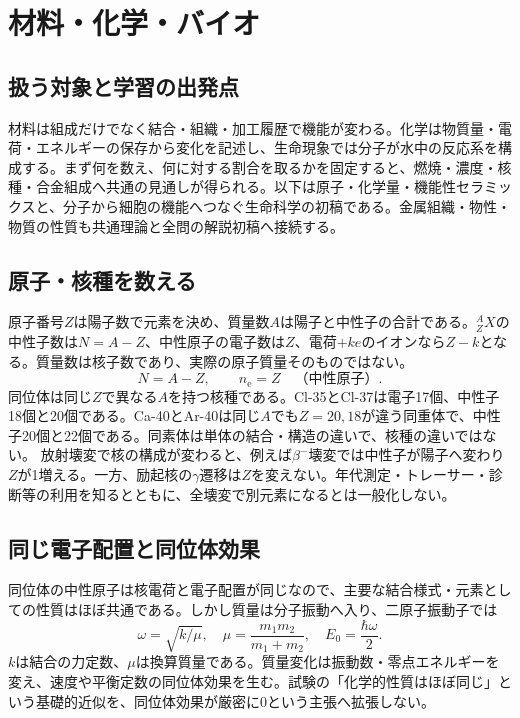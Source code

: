 \chapter{材料・化学・バイオ}
\section{扱う対象と学習の出発点}
材料は組成だけでなく結合・組織・加工履歴で機能が変わる。化学は物質量・電荷・エネルギーの保存から変化を記述し、生命現象では分子が水中の反応系を構成する。まず何を数え、何に対する割合を取るかを固定すると、燃焼・濃度・核種・合金組成へ共通の見通しが得られる。以下は原子・化学量・機能性セラミックスと、分子から細胞の機能へつなぐ生命科学の初稿である。金属組織・物性・物質の性質も共通理論と全問の解説初稿へ接続する。

\section{原子・核種を数える}
\label{theory:basicchem:isotope}
原子番号\(Z\)は陽子数で元素を決め、質量数\(A\)は陽子と中性子の合計である。\({}^{A}_{Z}X\)の中性子数は\(N=A-Z\)、中性原子の電子数は\(Z\)、電荷\(+ke\)のイオンなら\(Z-k\)となる。質量数は核子数であり、実際の原子質量そのものではない。
\begin{equation}N=A-Z,\qquad n_{\mathrm e}=Z\quad\text{（中性原子）}.\end{equation}
同位体は同じ\(Z\)で異なる\(A\)を持つ核種である\autocite{iupac_isotopes}。Cl-35とCl-37は電子17個、中性子18個と20個である。Ca-40とAr-40は同じ\(A\)でも\(Z=20,18\)が違う同重体で、中性子20個と22個である。同素体は単体の結合・構造の違いで、核種の違いではない。
放射壊変で核の構成が変わると、例えば\(\beta^-\)壊変では中性子が陽子へ変わり\(Z\)が1増える。一方、励起核の\(\gamma\)遷移は\(Z\)を変えない。年代測定・トレーサー・診断等の利用を知るとともに、全壊変で別元素になるとは一般化しない。

\section{同じ電子配置と同位体効果}
\label{theory:basicchem:isotope_effect}
同位体の中性原子は核電荷と電子配置が同じなので、主要な結合様式・元素としての性質はほぼ共通である。しかし質量は分子振動へ入り、二原子振動子では
\begin{equation}\omega=\sqrt{k/\mu},\quad\mu=\frac{m_1m_2}{m_1+m_2},\quad E_0=\frac{\hbar\omega}{2}.\end{equation}
\(k\)は結合の力定数、\(\mu\)は換算質量である。質量変化は振動数・零点エネルギーを変え、速度や平衡定数の同位体効果を生む\autocite{iupac_isotope_effect}。試験の「化学的性質はほぼ同じ」という基礎的近似を、同位体効果が厳密に0という主張へ拡張しない。


